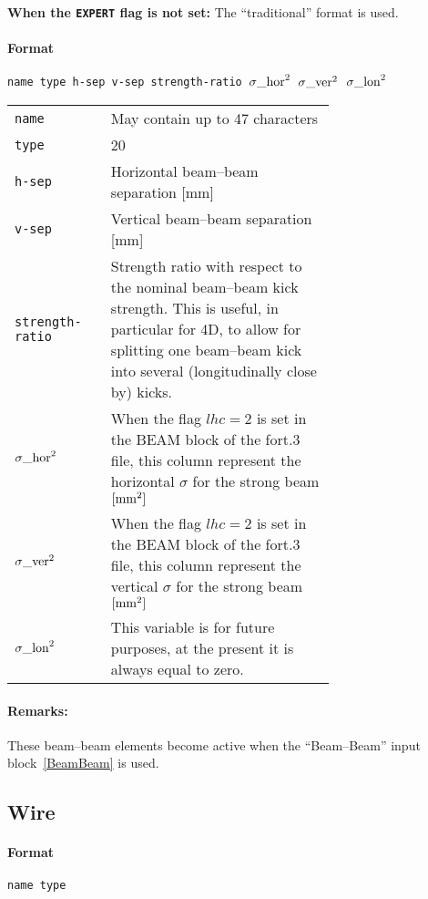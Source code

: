\bigskip
\noindent\textbf{When the \texttt{EXPERT} flag is not set:}
The ``traditional'' format is used.

\paragraph{Format} \texttt{name type h-sep v-sep strength-ratio ${\sigma\_\rm{hor}}^2$ ${\sigma\_\rm{ver}}^2$ ${\sigma\_\rm{lon}}^2$}

\bigskip
\begin{tabular}{@{}lp{0.7\linewidth}}
    \texttt{name}  & May contain up to 47 characters \\
    \texttt{type}  & 20 \\
    \texttt{h-sep} & Horizontal beam--beam separation [mm] \\
    \texttt{v-sep} & Vertical beam--beam separation [mm] \\
    \texttt{strength-ratio} & Strength ratio with respect to the nominal beam--beam kick strength. This is useful, in particular for 4D, to allow for splitting one beam--beam kick into several (longitudinally close by) kicks. \\
    \texttt{${\sigma\_\rm{hor}}^2$} & When the flag $lhc=2$ is set in the BEAM block of the fort.3 file, this column represent the horizontal $\sigma$ for the strong beam $\rm{[mm^2]}$ \\
    \texttt{${\sigma\_\rm{ver}}^2$} & When the flag $lhc=2$ is set in the BEAM block of the fort.3 file, this column represent the vertical $\sigma$ for the strong beam $\rm{[mm^2]}$ \\
    \texttt{${\sigma\_\rm{lon}}^2$} & This variable is for future purposes, at the present it is always equal to zero.
\end{tabular}

\paragraph{Remarks:}
These beam--beam elements become active when the ``Beam--Beam'' input block~\ref{BeamBeam} is used.

\subsection{Wire} \label{WIRE}

\paragraph{Format} \texttt{name type}

